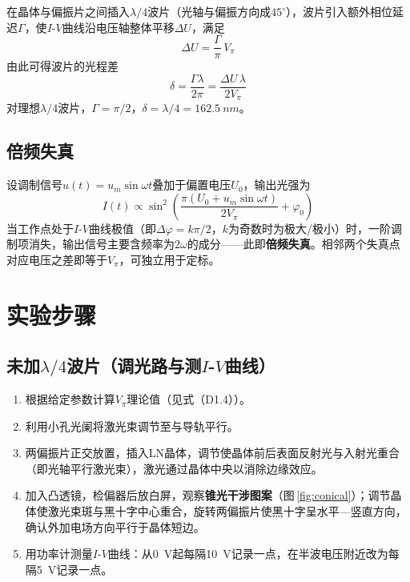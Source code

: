\documentclass[a4paper,8pt,twocolumn]{article}
\begin{document}
在晶体与偏振片之间插入$\lambda/4$波片（光轴与偏振方向成$45^\circ$），波片引入额外相位延迟$\Gamma$，使$I$-$V$曲线沿电压轴整体平移$\Delta U$，满足
\begin{equation}
  \Delta U = \frac{\Gamma}{\pi}\,V_\pi
  \tag{D1.6}
\end{equation}
由此可得波片的光程差
\begin{equation}
  \delta = \frac{\Gamma\lambda}{2\pi} = \frac{\Delta U\,\lambda}{2V_\pi}
  \tag{D1.7}
\end{equation}
对理想$\lambda/4$波片，$\Gamma=\pi/2$，$\delta=\lambda/4=\SI{162.5}{nm}$。

\subsection{倍频失真}

设调制信号$u(t)=u_m\sin\omega t$叠加于偏置电压$U_0$，输出光强为
\begin{equation}
  I(t) \propto \sin^2\!\!\left(\frac{\pi(U_0+u_m\sin\omega t)}{2V_\pi}+\varphi_0\right)
  \tag{D1.8}
\end{equation}
当工作点处于$I$-$V$曲线极值（即$\Delta\varphi = k\pi/2$，$k$为奇数时为极大/极小）时，一阶调制项消失，输出信号主要含频率为$2\omega$的成分——此即\textbf{倍频失真}。相邻两个失真点对应电压之差即等于$V_\pi$，可独立用于定标。

\section{实验步骤}

\subsection{未加$\lambda/4$波片（调光路与测$I$-$V$曲线）}

\begin{enumerate}[label=(\alph*)]
  \item 根据给定参数计算$V_\pi$理论值（见式（D1.4））。
  \item 利用小孔光阑将激光束调节至与导轨平行。
  \item 两偏振片正交放置，插入LN晶体，调节使晶体前后表面反射光与入射光重合（即光轴平行激光束），激光通过晶体中央以消除边缘效应。
  \item 加入凸透镜，检偏器后放白屏，观察\textbf{锥光干涉图案}（图\,\ref{fig:conical}）；调节晶体使激光束斑与黑十字中心重合，旋转两偏振片使黑十字呈水平—竖直方向，确认外加电场方向平行于晶体短边。
  \item 用功率计测量$I$-$V$曲线：从\SI{0}{V}起每隔\SI{10}{V}记录一点，在半波电压附近改为每隔\SI{5}{V}记录一点。
\end{enumerate}
\end{document}
